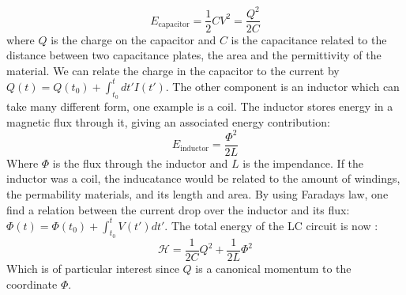 \begin{equation}
    E_{\text{capacitor}} = \frac{1}{2} CV^2 = \frac{Q^2}{2C}
\end{equation}
where $Q$ is the charge on the capacitor and $C$ is the capacitance related to the distance between two capacitance plates, the area and the permittivity of the material. We can relate the charge in the capacitor to the current by $Q(t) = Q(t_0) + \int_{t_0}^{t} dt' I(t')$. The other component is an inductor which can take many different form, one example is a coil. The inductor stores energy in a magnetic flux through it, giving an associated energy contribution:
\begin{equation}
    E_{\text{inductor}} = \frac{\Phi^2}{2 L}
\end{equation}
Where $\Phi$ is the flux through the inductor and $L$ is the impendance. If the inductor was a coil, the inducatance would be related to the amount of windings, the permability materials, and its length and area. By using Faradays law, one find a relation between the current drop over the inductor and its flux: $\Phi(t) = \Phi(t_0) + \int_{t_0}^t V(t')dt'$. The total energy of the LC circuit is now \cite{blais_circuit_2021}:
\begin{equation}
    \mathcal{H} = \frac{1}{2C} Q^2 + \frac{1}{2L} \Phi^2
\end{equation}
Which is of particular interest since $Q$ is a canonical momentum to the coordinate $\Phi$. 




